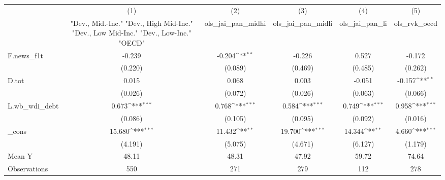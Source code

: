 {
\def\sym#1{\ifmmode^{#1}\else\(^{#1}\)\fi}
\begin{tabular}{l*{5}{c}}
\toprule
            &\multicolumn{1}{c}{(1)}&\multicolumn{1}{c}{(2)}&\multicolumn{1}{c}{(3)}&\multicolumn{1}{c}{(4)}&\multicolumn{1}{c}{(5)}\\
            &\multicolumn{1}{c}{ "Dev., Mid.-Inc." "Dev., High Mid-Inc." "Dev., Low Mid-Inc." "Dev., Low-Inc." "OECD" }&\multicolumn{1}{c}{ols\_jai\_pan\_midhi}&\multicolumn{1}{c}{ols\_jai\_pan\_midli}&\multicolumn{1}{c}{ols\_jai\_pan\_li}&\multicolumn{1}{c}{ols\_rvk\_oecd}\\
\midrule
F.news\_f1t  &      -0.239         &      -0.204\sym{**} &      -0.226         &       0.527         &      -0.172         \\
            &     (0.220)         &     (0.089)         &     (0.469)         &     (0.485)         &     (0.262)         \\
\addlinespace
D.tot       &       0.015         &       0.068         &       0.003         &      -0.051         &      -0.157\sym{**} \\
            &     (0.026)         &     (0.072)         &     (0.026)         &     (0.063)         &     (0.066)         \\
\addlinespace
L.wb\_wdi\_debt&       0.673\sym{***}&       0.768\sym{***}&       0.584\sym{***}&       0.749\sym{***}&       0.958\sym{***}\\
            &     (0.086)         &     (0.105)         &     (0.095)         &     (0.092)         &     (0.016)         \\
\addlinespace
\_cons      &      15.680\sym{***}&      11.432\sym{**} &      19.700\sym{***}&      14.344\sym{**} &       4.660\sym{***}\\
            &     (4.191)         &     (5.075)         &     (4.671)         &     (6.127)         &     (1.179)         \\
\midrule
Mean Y      &       48.11         &       48.31         &       47.92         &       59.72         &       74.64         \\
Observations&         550         &         271         &         279         &         112         &         278         \\
\bottomrule
\end{tabular}
}
